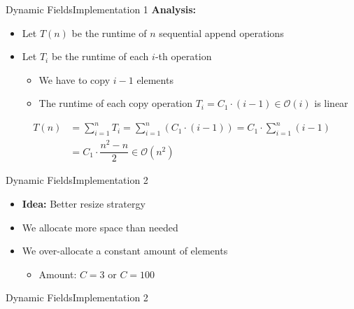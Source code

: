 
\begin{frame}{Dynamic Fields}{Implementation 1}
  \textbf{Analysis:}
  \begin{itemize}
    \item
      Let $T(n)$ be the runtime of $n$ sequential append operations
    \item
      Let $T_i$ be the runtime of each $i$-th operation
      \begin{itemize}
        \item
          We have to copy $i-1$ elements
        \item
          The runtime of each copy operation
          $T_i = C_1 \cdot (i - 1) \in \mathcal{O}(i)$ is linear
      \end{itemize}
  \end{itemize}
  \begin{align*}
    T(n) &= \sum_{i=1}^n T_i
      = \sum_{i=1}^n \left(C_1 \cdot (i-1) \right)
      = C_1 \cdot \sum_{i=1}^n (i-1)\\
      &= C_1 \cdot \dfrac{n^2-n}{2} \in \mathcal{O}(n^2)
  \end{align*}
\end{frame}


\begin{frame}{Dynamic Fields}{Implementation 2}
  \begin{itemize}
    \item
      \textbf{Idea:}
      Better resize stratergy
    \item
      We allocate more space than needed
    \item
      We over-allocate a constant amount of elements
      \begin{itemize}
        \item
          Amount: $C = 3$ or $C = 100$
      \end{itemize}
  \end{itemize}
\end{frame}


\begin{frame}{Dynamic Fields}{Implementation 2}
  
\end{frame}

